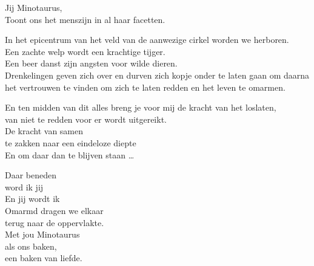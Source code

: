 \documentclass[
  11pt,
]{book}
\begin{document}
Jij Minotaurus,\\
Toont ons het menszijn in al haar facetten.

In het epicentrum van het veld van de aanwezige cirkel worden we herboren.\\
Een zachte welp wordt een krachtige tijger.\\
Een beer danst zijn angsten voor wilde dieren.\\
Drenkelingen geven zich over en durven zich kopje onder te laten gaan om daarna het vertrouwen te vinden om zich te laten redden en het leven te omarmen.

En ten midden van dit alles breng je voor mij de kracht van het loslaten,\\
van niet te redden voor er wordt uitgereikt.\\
De kracht van samen\\
te zakken naar een eindeloze diepte\\
En om daar dan te blijven staan \ldots{}

Daar beneden\\
word ik jij\\
En jij wordt ik\\
Omarmd dragen we elkaar\\
terug naar de oppervlakte.\\
Met jou Minotaurus\\
als ons baken,\\
een baken van liefde.


\end{document}
